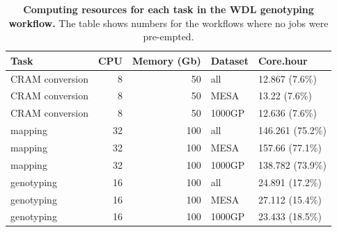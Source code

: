 \documentclass[11pt]{ucscthesis}
\begin{document}
\begin{table}[p]
  \centering
  \begin{tabular}[t]{|l|r|r|l|l|}
    \hline
    Task            & CPU & Memory (Gb) & Dataset & Core.hour        \\
    \hline
    CRAM conversion & 8   & 50          & all     & 12.867 (7.6\%)   \\
    CRAM conversion & 8   & 50          & MESA    & 13.22 (7.6\%)    \\
    CRAM conversion & 8   & 50          & 1000GP  & 12.636 (7.6\%)   \\
    \hline
    mapping         & 32  & 100         & all     & 146.261 (75.2\%) \\
    mapping         & 32  & 100         & MESA    & 157.66 (77.1\%)  \\
    mapping         & 32  & 100         & 1000GP  & 138.782 (73.9\%) \\
    \hline
    genotyping      & 16  & 100         & all     & 24.891 (17.2\%)  \\
    genotyping      & 16  & 100         & MESA    & 27.112 (15.4\%)  \\
    genotyping      & 16  & 100         & 1000GP  & 23.433 (18.5\%)  \\
    \hline
  \end{tabular}
  \caption[Computing resources for each task in the WDL genotyping workflow]{{\bf Computing resources for each task in the WDL genotyping workflow.}
    The table shows numbers for the workflows where no jobs were pre-empted.}
  \label{tab:svwdl-task}
\end{table}
\end{document}
